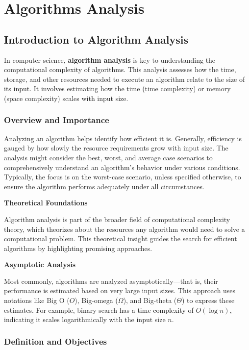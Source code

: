 \documentclass[12pt]{book} %
\begin{document}
\chapter{Algorithms Analysis}

\section{Introduction to Algorithm Analysis}

In computer science, \textbf{algorithm analysis} is key to understanding the computational complexity of algorithms. This analysis assesses how the time, storage, and other resources needed to execute an algorithm relate to the size of its input. It involves estimating how the time (time complexity) or memory (space complexity) scales with input size.

\subsection{Overview and Importance}

Analyzing an algorithm helps identify how efficient it is. Generally, efficiency is gauged by how slowly the resource requirements grow with input size. The analysis might consider the best, worst, and average case scenarios to comprehensively understand an algorithm's behavior under various conditions. Typically, the focus is on the worst-case scenario, unless specified otherwise, to ensure the algorithm performs adequately under all circumstances.

\textbf{Theoretical Foundations}

Algorithm analysis is part of the broader field of computational complexity theory, which theorizes about the resources any algorithm would need to solve a computational problem. This theoretical insight guides the search for efficient algorithms by highlighting promising approaches.

\textbf{Asymptotic Analysis}

Most commonly, algorithms are analyzed asymptotically—that is, their performance is estimated based on very large input sizes. This approach uses notations like Big O (\(O\)), Big-omega (\(\Omega\)), and Big-theta (\(\Theta\)) to express these estimates. For example, binary search has a time complexity of \(O(\log n)\), indicating it scales logarithmically with the input size \(n\).

\subsection{Definition and Objectives}
\end{document}
